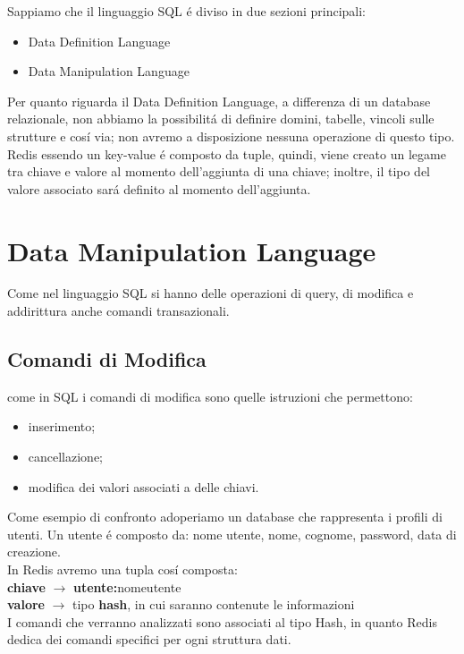 Sappiamo che il linguaggio SQL é diviso in due sezioni principali:
\begin{itemize}
    \item Data Definition Language
    \item Data Manipulation Language
\end{itemize}

Per quanto riguarda il Data Definition Language, a differenza di un database relazionale, non abbiamo la possibilitá di definire
domini, tabelle, vincoli sulle strutture e cosí via; non avremo a disposizione nessuna operazione di questo tipo.\\
Redis essendo un key-value é composto da tuple, quindi, viene creato un legame tra chiave e valore al momento dell'aggiunta di una chiave; inoltre, il tipo del valore
associato sará definito al momento dell'aggiunta.
\section{Data Manipulation Language}
Come nel linguaggio SQL si hanno delle operazioni di query, di modifica e addirittura anche comandi transazionali.

\subsection{Comandi di Modifica}
come in SQL i comandi di modifica sono quelle istruzioni che permettono:
\begin{itemize}
    \item inserimento;
    \item cancellazione;
    \item modifica dei valori associati a delle chiavi.\\
\end{itemize}


Come esempio di confronto adoperiamo un database che rappresenta i profili di utenti.
Un utente é composto da: nome utente, nome, cognome, password, data di creazione.\\

In Redis avremo una tupla cosí composta:\\
\textbf{chiave} $\to$ \textbf{utente:}nomeutente\\
\textbf{valore} $\to$ tipo \textbf{hash}, in cui saranno contenute le informazioni\\
I comandi che verranno analizzati sono associati al tipo Hash, in quanto Redis dedica dei comandi specifici per ogni struttura dati.\\

